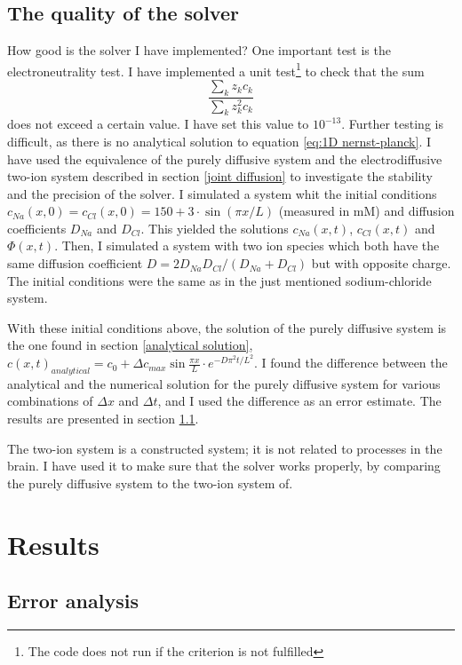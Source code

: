 \documentclass{article}
\begin{document}
\subsection{The quality of the solver}
How good is the solver I have implemented? One important test is the electroneutrality test. I have implemented a unit test\footnote{The code does not run if the criterion is not fulfilled} to check that the sum 
$$\frac{\sum_k z_k c_k}{\sum_k z_k^2 c_k}$$
does not exceed a certain value. I have set this value to $10^{-13}$. Further testing is difficult, as there is no analytical solution to equation \ref{eq:1D nernst-planck}. 
I have used the equivalence of the purely diffusive system and the electrodiffusive two-ion system described in section \ref{joint diffusion} to investigate the stability and the precision of the solver. I simulated a system whit the initial conditions $c_{Na}(x,0)=c_{Cl}(x,0)=150+3\cdot \sin(\pi x/L)$ (measured in mM) and diffusion coefficients $D_{Na}$ and $D_{Cl}$. This yielded the solutions $c_{Na}(x,t)$, $c_{Cl}(x,t)$ and $\Phi (x,t)$. Then, I simulated a system with two ion species which both have the same diffusion coefficient $D=2D_{Na}D_{Cl}/(D_{Na}+D_{Cl})$ but with opposite charge. The initial conditions were the same as in the just mentioned sodium-chloride system.

With these initial conditions above, the solution of the purely diffusive system is the one found in section \ref{analytical solution}, $c(x,t)_{analytical} =c_0 + \Delta c_{max} \sin \frac{ \pi x}{L}\cdot e^{-D\pi^2 t /L^2}$. I found the difference between the analytical and the numerical solution for the purely diffusive system for various combinations of $\Delta x$ and $\Delta t$, and I used the difference as an error estimate. The results are presented in section \ref{numerical vs analytical}. 

The two-ion system is a constructed system; it is not related to processes in the brain. I have used it to make sure that the solver works properly, by comparing the purely diffusive system to the two-ion system of. 



\section{Results}
\subsection{Error analysis}\label{numerical vs analytical}
\end{document}
